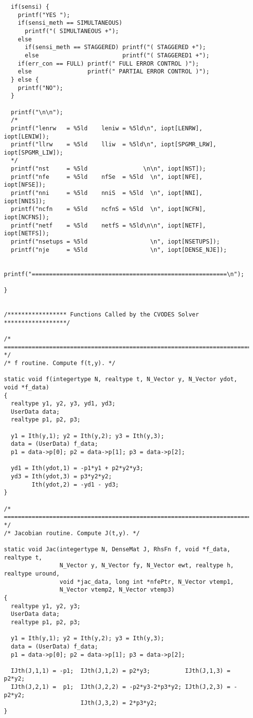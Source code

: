 \begin{verbatim}
  if(sensi) {
    printf("YES ");
    if(sensi_meth == SIMULTANEOUS)   
      printf("( SIMULTANEOUS +");
    else 
      if(sensi_meth == STAGGERED) printf("( STAGGERED +");
      else                        printf("( STAGGERED1 +");   
    if(err_con == FULL) printf(" FULL ERROR CONTROL )");
    else                printf(" PARTIAL ERROR CONTROL )");
  } else {
    printf("NO");
  }

  printf("\n\n");
  /*
  printf("lenrw   = %5ld    leniw = %5ld\n", iopt[LENRW], iopt[LENIW]);
  printf("llrw    = %5ld    lliw  = %5ld\n", iopt[SPGMR_LRW], iopt[SPGMR_LIW]);
  */
  printf("nst     = %5ld                \n\n", iopt[NST]);
  printf("nfe     = %5ld    nfSe  = %5ld  \n", iopt[NFE],  iopt[NFSE]);
  printf("nni     = %5ld    nniS  = %5ld  \n", iopt[NNI],  iopt[NNIS]);
  printf("ncfn    = %5ld    ncfnS = %5ld  \n", iopt[NCFN], iopt[NCFNS]);
  printf("netf    = %5ld    netfS = %5ld\n\n", iopt[NETF], iopt[NETFS]);
  printf("nsetups = %5ld                  \n", iopt[NSETUPS]);
  printf("nje     = %5ld                  \n", iopt[DENSE_NJE]);

  printf("========================================================\n");

}


/***************** Functions Called by the CVODES Solver ******************/

/* ======================================================================= */
/* f routine. Compute f(t,y). */

static void f(integertype N, realtype t, N_Vector y, N_Vector ydot, void *f_data)
{
  realtype y1, y2, y3, yd1, yd3;
  UserData data;
  realtype p1, p2, p3;

  y1 = Ith(y,1); y2 = Ith(y,2); y3 = Ith(y,3);
  data = (UserData) f_data;
  p1 = data->p[0]; p2 = data->p[1]; p3 = data->p[2];

  yd1 = Ith(ydot,1) = -p1*y1 + p2*y2*y3;
  yd3 = Ith(ydot,3) = p3*y2*y2;
        Ith(ydot,2) = -yd1 - yd3;
}

/* ======================================================================= */
/* Jacobian routine. Compute J(t,y). */

static void Jac(integertype N, DenseMat J, RhsFn f, void *f_data, realtype t,
                N_Vector y, N_Vector fy, N_Vector ewt, realtype h, realtype uround,
                void *jac_data, long int *nfePtr, N_Vector vtemp1,
                N_Vector vtemp2, N_Vector vtemp3)
{
  realtype y1, y2, y3;
  UserData data;
  realtype p1, p2, p3;
 
  y1 = Ith(y,1); y2 = Ith(y,2); y3 = Ith(y,3);
  data = (UserData) f_data;
  p1 = data->p[0]; p2 = data->p[1]; p3 = data->p[2];
 
  IJth(J,1,1) = -p1;  IJth(J,1,2) = p2*y3;          IJth(J,1,3) = p2*y2;
  IJth(J,2,1) =  p1;  IJth(J,2,2) = -p2*y3-2*p3*y2; IJth(J,2,3) = -p2*y2;
                      IJth(J,3,2) = 2*p3*y2;
}
\end{verbatim}